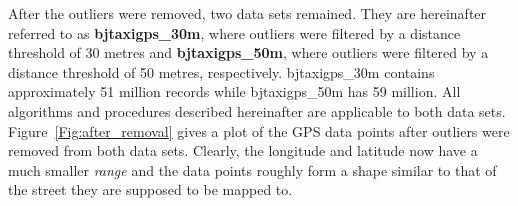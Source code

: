 After the outliers were removed, two data sets remained. They are hereinafter referred to as \textbf{bjtaxigps\_30m}, where outliers were filtered by a distance threshold of 30 metres and \textbf{bjtaxigps\_50m}, where outliers were filtered by a distance threshold of 50 metres, respectively. bjtaxigps\_30m contains approximately 51 million records while bjtaxigps\_50m has 59 million. All algorithms and procedures described hereinafter are applicable to both data sets. Figure~\ref{Fig:after_removal} gives a plot of the GPS data points after outliers were removed from both data sets. Clearly, the longitude and latitude now have a much smaller \emph{range} and the data points roughly form a shape similar to that of the street they are supposed to be mapped to. 